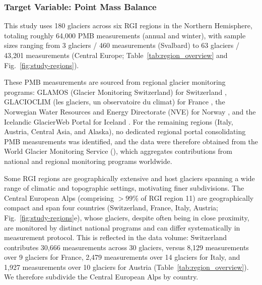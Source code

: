 \documentclass[draft]{agujournal2019}
\begin{document}
\subsubsection{Target Variable: Point Mass Balance}\label{subsec:study_site_and_data}

This study uses 180 glaciers across six RGI regions in the Northern Hemisphere, totaling roughly 64,000 PMB measurements (annual and winter), with sample sizes ranging from 3 glaciers / 460 measurements (Svalbard) to 63 glaciers / 43,201 measurements (Central Europe; Table~\ref{tab:region_overview} and Fig.~\ref{fig:study-regions}).

These PMB measurements are sourced from regional glacier monitoring programs: GLAMOS (Glacier Monitoring Switzerland) for Switzerland \citep{GLAMOS_point}, GLACIOCLIM (les glaciers, un observatoire du climat) for France \citep{GLACIOCLIM_point}, the Norwegian Water Resources and Energy Directorate (NVE) for Norway \citep{Elvehoy2025}, and the Icelandic GlacierWeb Portal for Iceland \citep{Bjornsson1998, Adalgeirsdottir2020}. For the remaining regions (Italy, Austria, Central Asia, and Alaska), no dedicated regional portal consolidating PMB measurements was identified, and the data were therefore obtained from the World Glacier Monitoring Service (\citealp{WGMS2023}), which aggregates contributions from national and regional monitoring programs worldwide.


Some RGI regions are geographically extensive and host glaciers spanning a wide range of climatic and topographic settings, motivating finer subdivisions. The Central European Alps (comprising $>$99\% of RGI region 11) are geographically compact and span four countries (Switzerland, France, Italy, Austria; Fig.~\ref{fig:study-regions}e), whose glaciers, despite often being in close proximity, are monitored by distinct national programs and can differ systematically in measurement protocol. This is reflected in the data volume: Switzerland contributes 30,666 measurements across 30 glaciers, versus 8,129 measurements over 9 glaciers for France, 2,479 measurements over 14 glaciers for Italy, and 1,927 measurements over 10 glaciers for Austria (Table~\ref{tab:region_overview}). We therefore subdivide the Central European Alps by country.
\end{document}

